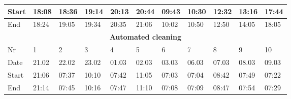 \begin{table}[H]
\begin{tabular}{|lllllllllll|}
\multicolumn{1}{|l|}{Start}  & \multicolumn{1}{l|}{18:08} & \multicolumn{1}{l|}{18:36} & \multicolumn{1}{l|}{19:14} & \multicolumn{1}{l|}{20:13} & \multicolumn{1}{l|}{20:44} & \multicolumn{1}{l|}{09:43} & \multicolumn{1}{l|}{10:30} & \multicolumn{1}{l|}{12:32} & \multicolumn{1}{l|}{13:16} & 17:44 \\ \hline
\multicolumn{1}{|l|}{End}    & \multicolumn{1}{l|}{18:24} & \multicolumn{1}{l|}{19:05} & \multicolumn{1}{l|}{19:34} & \multicolumn{1}{l|}{20:35} & \multicolumn{1}{l|}{21:06} & \multicolumn{1}{l|}{10:02} & \multicolumn{1}{l|}{10:50} & \multicolumn{1}{l|}{12:50} & \multicolumn{1}{l|}{14:05} & 18:05 \\ \hline
\multicolumn{11}{|c|}{\textbf{Automated cleaning}}                                                                                                                                                                                                                                                        \\ \hline
\multicolumn{1}{|l|}{Nr} & \multicolumn{1}{l|}{1}     & \multicolumn{1}{l|}{2}     & \multicolumn{1}{l|}{3}     & \multicolumn{1}{l|}{4}     & \multicolumn{1}{l|}{5}     & \multicolumn{1}{l|}{6}     & \multicolumn{1}{l|}{7}     & \multicolumn{1}{l|}{8}     & \multicolumn{1}{l|}{9}     & 10    \\ \hline
\multicolumn{1}{|l|}{Date}   & \multicolumn{1}{l|}{21.02} & \multicolumn{1}{l|}{22.02} & \multicolumn{1}{l|}{23.02} & \multicolumn{1}{l|}{01.03} & \multicolumn{1}{l|}{02.03} & \multicolumn{1}{l|}{03.03} & \multicolumn{1}{l|}{06.03} & \multicolumn{1}{l|}{07.03} & \multicolumn{1}{l|}{08.03} & 09.03 \\ \hline
\multicolumn{1}{|l|}{Start}  & \multicolumn{1}{l|}{21:06} & \multicolumn{1}{l|}{07:37} & \multicolumn{1}{l|}{10:10} & \multicolumn{1}{l|}{07:42} & \multicolumn{1}{l|}{11:05} & \multicolumn{1}{l|}{07:03} & \multicolumn{1}{l|}{07:04} & \multicolumn{1}{l|}{08:42} & \multicolumn{1}{l|}{07:49} & 07:22 \\ \hline
\multicolumn{1}{|l|}{End}    & \multicolumn{1}{l|}{21:14} & \multicolumn{1}{l|}{07:45} & \multicolumn{1}{l|}{10:16} & \multicolumn{1}{l|}{07:47} & \multicolumn{1}{l|}{11:10} & \multicolumn{1}{l|}{07:08} & \multicolumn{1}{l|}{07:09} & \multicolumn{1}{l|}{08:47} & \multicolumn{1}{l|}{07:54} & 07:29 \\ \hline
\end{tabular}
\end{table}


